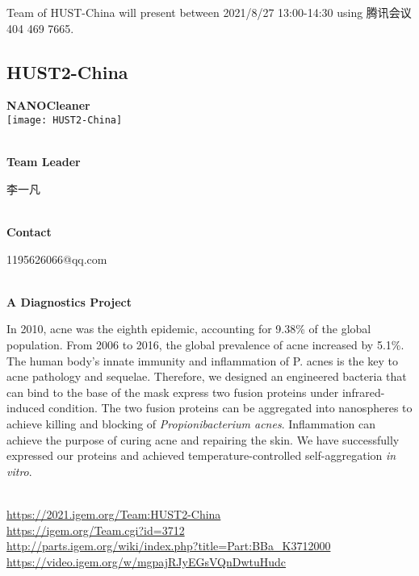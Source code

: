 Team of HUST-China will present between 2021/8/27 13:00-14:30        using 腾讯会议 404 469 7665.
\newpage


\subsection{\textcolor{Blu}{ HUST2-China } }
\vspace{5mm}
\begin{center}
\large{
  \textbf{ NANOCleaner }\\

  \texttt{[image: HUST2-China]}
}
\end{center}
\textbf{\\Team Leader}

  李一凡


\textbf{\\Contact}

  1195626066@qq.com


\textbf{\\A Diagnostics Project\\}\begin{spacing}{1.5}

In 2010, acne was the eighth epidemic, accounting for 9.38\% of the global population. From 2006 to 2016, the global prevalence of acne increased by 5.1\%. The human body’s innate immunity and inflammation of P. acnes is the key to acne pathology and sequelae. Therefore, we designed an engineered bacteria that can bind to the base of the mask express two fusion proteins under infrared-induced condition. The two fusion proteins can be aggregated into nanospheres to achieve killing and blocking of \textit{Propionibacterium acnes}. Inflammation can achieve the purpose of curing acne and repairing the skin. We have successfully expressed our proteins and achieved temperature-controlled self-aggregation \textit{in vitro}.\end{spacing}
\\

\url{https://2021.igem.org/Team:HUST2-China }\\
\url{https://igem.org/Team.cgi?id=3712 }\\
\url{http://parts.igem.org/wiki/index.php?title=Part:BBa_K3712000 }\\
\url{https://video.igem.org/w/mgpajRJyEGsVQnDwtuHudc }\\

\vfill{}









